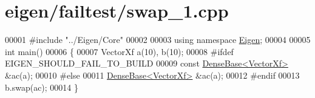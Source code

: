 \hypertarget{eigen_2failtest_2swap__1_8cpp_source}{}\section{eigen/failtest/swap\+\_\+1.cpp}
\label{eigen_2failtest_2swap__1_8cpp_source}

\begin{DoxyCode}
00001 \textcolor{preprocessor}{#include "../Eigen/Core"}
00002 
00003 \textcolor{keyword}{using namespace }\hyperlink{namespace_eigen}{Eigen};
00004 
00005 \textcolor{keywordtype}{int} main()
00006 \{
00007   VectorXf a(10), b(10);
00008 \textcolor{preprocessor}{#ifdef EIGEN\_SHOULD\_FAIL\_TO\_BUILD}
00009   \textcolor{keyword}{const} \hyperlink{group___core___module_class_eigen_1_1_dense_base}{DenseBase<VectorXf>} &ac(a);
00010 \textcolor{preprocessor}{#else}
00011   \hyperlink{group___core___module_class_eigen_1_1_dense_base}{DenseBase<VectorXf>} &ac(a);
00012 \textcolor{preprocessor}{#endif}
00013   b.swap(ac);
00014 \}
\end{DoxyCode}
